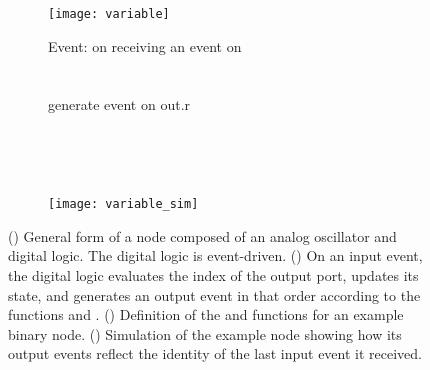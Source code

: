 \documentclass[10pt]{article}
\begin{document}
\begin{figure}[h]
 \centering
     \begin{subfigure}[b]{0.4\textwidth}
     \texttt{[image: variable]} 
     \subcaption{}
     \label{fig:variable_a}
   \end{subfigure}
   \quad\quad\quad
   \begin{subfigure}[b]{0.4\textwidth}
     \begin{minipage}{2.3in}
     Event: on receiving an event on \\
     \hspace*{0.2in}  \\
     \hspace*{0.2in} \\
     \hspace*{0.2in} generate event on out.r
     \end{minipage}
     \subcaption{}
     \label{fig:variable_b}
   \end{subfigure}
   \\
   \begin{subfigure}[b]{0.6\textwidth}
     \begin{minipage}{2.3in}
       
     \end{minipage}
     \subcaption{}
     \label{fig:variable_c}
     \end{subfigure} \\
     \begin{subfigure}[b]{0.6\textwidth}
       
       \texttt{[image: variable\_sim]} 
       \subcaption{}
       \label{fig:variable_d}
     \end{subfigure}
     

   \caption{() General form of a node composed of an analog oscillator and digital logic. The digital logic is event-driven. () On an input event, the digital logic evaluates the index of the output port, updates its state, and generates an output event in that order according to the functions  and . () Definition of the  and  functions for an example binary node. () Simulation of the example node showing how its output events reflect the identity of the last input event it received.}
\label{fig:variable}
\end{figure}	
\end{document}
